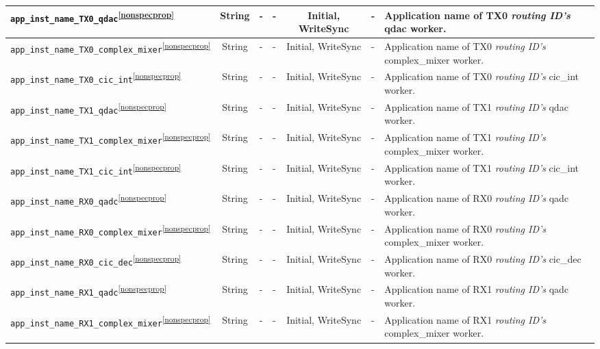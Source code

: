 \documentclass{article}
\begin{document}
\begin{landscape}
\begin{scriptsize}
\begin{longtable}{|p{5.16cm}|c|p{3.5cm}|p{3.4cm}|c|p{2.1cm}|p{3.75cm}|}
			\hline
			\verb+app_inst_name_TX0_qdac+\textsuperscript{\ref{nonspecprop}}    & String & - & - & Initial, WriteSync & -       & Application name of TX0 \textit{routing ID's} qdac worker. \\
			\hline
			\verb+app_inst_name_TX0_complex_mixer+\textsuperscript{\ref{nonspecprop}}    & String & - & - & Initial, WriteSync & -       & Application name of TX0 \textit{routing ID's} complex\_mixer worker.\\
			\hline
			\verb+app_inst_name_TX0_cic_int+\textsuperscript{\ref{nonspecprop}}    & String & - & - & Initial, WriteSync & -       & Application name of TX0 \textit{routing ID's} cic\_int worker.\\
			\hline
			\verb+app_inst_name_TX1_qdac+\textsuperscript{\ref{nonspecprop}}    & String & - & - & Initial, WriteSync & -       & Application name of TX1 \textit{routing ID's} qdac worker. \\
			\hline
			\verb+app_inst_name_TX1_complex_mixer+\textsuperscript{\ref{nonspecprop}}    & String & - & - & Initial, WriteSync & -       & Application name of TX1 \textit{routing ID's} complex\_mixer worker.\\
			\hline
			\verb+app_inst_name_TX1_cic_int+\textsuperscript{\ref{nonspecprop}}    & String & - & - & Initial, WriteSync & -       & Application name of TX1 \textit{routing ID's} cic\_int worker.\\
			\hline
			\verb+app_inst_name_RX0_qadc+\textsuperscript{\ref{nonspecprop}}    & String & - & - & Initial, WriteSync & -       & Application name of RX0 \textit{routing ID's} qadc worker. \\
			\hline
			\verb+app_inst_name_RX0_complex_mixer+\textsuperscript{\ref{nonspecprop}}    & String & - & - & Initial, WriteSync & -       & Application name of RX0 \textit{routing ID's} complex\_mixer worker.\\
			\hline
			\verb+app_inst_name_RX0_cic_dec+\textsuperscript{\ref{nonspecprop}}    & String & - & - & Initial, WriteSync & -       & Application name of RX0 \textit{routing ID's} cic\_dec worker.\\
			\hline
			\verb+app_inst_name_RX1_qadc+\textsuperscript{\ref{nonspecprop}}    & String & - & - & Initial, WriteSync & -       & Application name of RX1 \textit{routing ID's} qadc worker. \\
			\hline
			\verb+app_inst_name_RX1_complex_mixer+\textsuperscript{\ref{nonspecprop}}    & String & - & - & Initial, WriteSync & -       & Application name of RX1 \textit{routing ID's} complex\_mixer worker.\\

\end{longtable}
\end{scriptsize}
\end{landscape}
\end{document}
